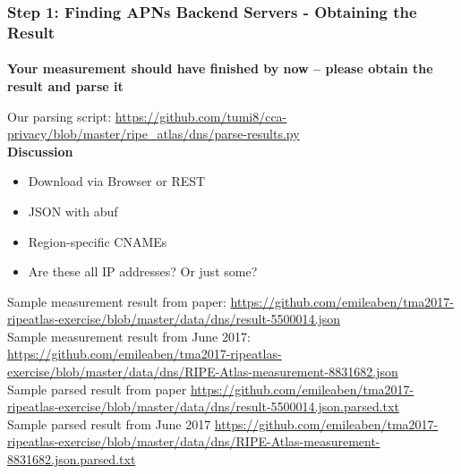 \begin{frame}
\frametitle{Step 1: Finding APNs Backend Servers - Obtaining the Result}
\framesubtitle{}
\textbf{Your measurement should have finished by now -- please obtain the result and parse it} 

Our parsing script: \url{https://github.com/tumi8/cca-privacy/blob/master/ripe\_atlas/dns/parse-results.py}\\

\pause
 \textbf{Discussion}
 \vspace{-5mm}
\begin{itemize}
	\item Download via Browser or REST
	\item JSON with abuf
	\item Region-specific CNAMEs
	\item Are these all IP addresses? Or just some?
\end{itemize}
\small{
Sample measurement result from paper: \url{https://github.com/emileaben/tma2017-ripeatlas-exercise/blob/master/data/dns/result-5500014.json}\\
Sample measurement result from June 2017: \url{https://github.com/emileaben/tma2017-ripeatlas-exercise/blob/master/data/dns/RIPE-Atlas-measurement-8831682.json}\\
Sample parsed result from paper \url{https://github.com/emileaben/tma2017-ripeatlas-exercise/blob/master/data/dns/result-5500014.json.parsed.txt} \\
Sample parsed result from June 2017 \url{https://github.com/emileaben/tma2017-ripeatlas-exercise/blob/master/data/dns/RIPE-Atlas-measurement-8831682.json.parsed.txt}\\
}

\end{frame}
\clearpage

